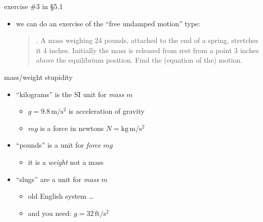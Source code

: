 \documentclass{beamer}
\begin{document}
\begin{frame}{exercise \#3 in \S5.1}

\begin{itemize}
\item we can do an exercise of the ``free undamped motion'' type:

\begin{quotation}
. A mass weighing 24 pounds, attached to the end of a spring, stretches it 4 inches.  Initially the mass is released from rest from a point 3 inches above the equilibrium position.  Find the (equation of the) motion.
\end{quotation}
\end{itemize}

\vspace{40mm}
\end{frame}


\begin{frame}{mass/weight stupidity}

\begin{itemize}
\item ``kilograms'' is the SI unit for \emph{mass} $m$
    \begin{itemize}
    \item $g=9.8 \,\text{m}/\text{s}^2$ is acceleration of gravity
    \item $mg$ is a force in newtons $N = \text{kg}\,\text{m}/\text{s}^2$
    \end{itemize}
\item ``pounds'' is a unit for \emph{force} $mg$
    \begin{itemize}
    \item it is a \emph{weight} not a mass
    \end{itemize}
\item ``slugs'' are a unit for \emph{mass} $m$
    \begin{itemize}
    \item old English system \dots
    \item and you need: $g=32 \,\text{ft}/\text{s}^2$
    \end{itemize}
\end{itemize}
\end{frame}
\end{document}
